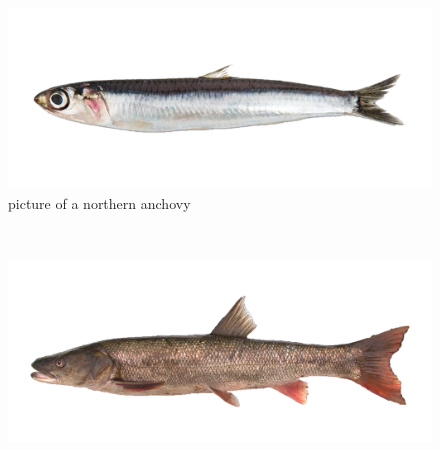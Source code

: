 \documentclass[
]{book}
\begin{document}
\begin{panel-grid}
\begin{columns-nocenter}
\begin{column800}
\end{column800}

\begin{column40}

~

\end{column40}

\begin{column800}

\begin{figure}

{\centering \includegraphics[width=14.58in]{figures/Anchovy-1} 

}

\caption{picture of a northern anchovy}\label{fig:unnamed-chunk-77}
\end{figure}

\end{column800}

\begin{column40}

~

\end{column40}

\begin{column800}

\begin{figure}

{\centering \includegraphics[width=29.17in]{figures/sacramento_pikeminnow} 

}
\end{figure}
\end{column800}
\end{columns-nocenter}
\end{panel-grid}
\end{document}
